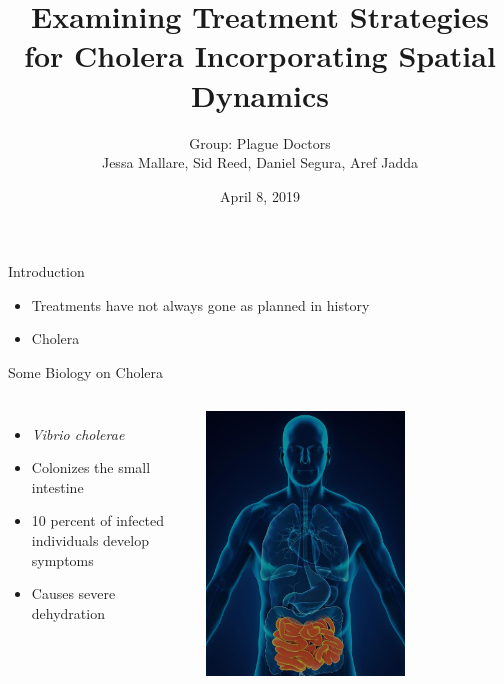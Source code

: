 \documentclass{beamer}\usepackage[]{graphicx}\usepackage[]{color}
\title[Modelling Cholera Treatments]
{Examining Treatment Strategies for Cholera Incorporating Spatial Dynamics}
\author[Plague Doctors]{Group: Plague Doctors \\ Jessa Mallare, Sid Reed, Daniel Segura, Aref Jadda}
\institute[McMaster]{McMaster University \and
Instructor: Dr. David Earn}
\date[April 8, 2019]{April 8, 2019}
\begin{document}
\begin{frame}
\titlepage
\end{frame}

\begin{frame}{Introduction}
\begin{itemize}
\setlength\itemsep{2em}
\item Treatments have not always gone as planned in history
\item Cholera
\end{itemize}
\end{frame}

\begin{frame}{Some Biology on Cholera}
\begin{columns}[onlytextwidth]
\begin{itemize}
\setlength\itemsep{2em}
\item \textit{Vibrio cholerae}
\item Colonizes the small intestine
\item 10 percent of infected individuals develop symptoms
\item Causes severe dehydration
\end{itemize}
\includegraphics[width=0.65\textwidth]{images/SI.jpg}
\end{columns}
\end{frame}
\end{document}
